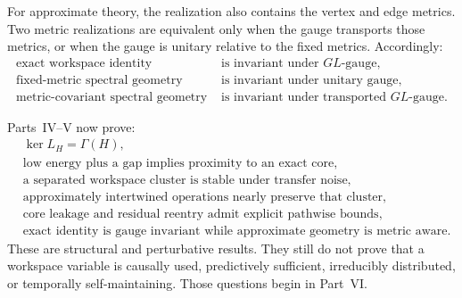 For approximate theory, the realization also contains the vertex and edge
metrics. Two metric realizations are equivalent only when the gauge transports
those metrics, or when the gauge is unitary relative to the fixed metrics.
Accordingly:
\[
\boxed{
\begin{aligned}
\text{exact workspace identity}
&\text{ is invariant under }GL\text{-gauge},\\
\text{fixed-metric spectral geometry}
&\text{ is invariant under unitary gauge},\\
\text{metric-covariant spectral geometry}
&\text{ is invariant under transported }GL\text{-gauge}.
\end{aligned}
}
\]

\clearpage
{}

Parts~IV--V now prove:
\[
\begin{aligned}
&\ker L_H=\Gamma(H),\\
&\text{low energy plus a gap implies proximity to an exact core},\\
&\text{a separated workspace cluster is stable under transfer noise},\\
&\text{approximately intertwined operations nearly preserve that cluster},\\
&\text{core leakage and residual reentry admit explicit pathwise bounds},\\
&\text{exact identity is gauge invariant while approximate geometry is metric aware}.
\end{aligned}
\]
These are structural and perturbative results. They still do not prove that a
workspace variable is causally used, predictively sufficient, irreducibly
distributed, or temporally self-maintaining. Those questions begin in
Part~VI.


